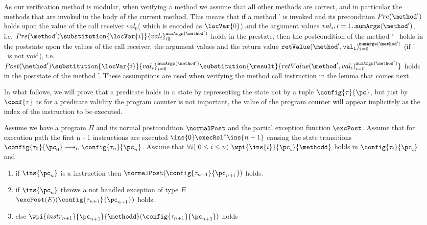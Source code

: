As our verification method is modular, when verifying a method we assume that all other methods are correct, and in particular the methods that are invoked in the body of the current method. This means that if a method \method' is invoked and its precondition  $Pre( \method')$ holds upon the value of the call receiver $val_0$( which is encoded as $\locVar{0}$) and the argument values $val_i , i = 1.. \tt{numArgs}(\method')$, i.e.  
$Pre( \method') \substitution{\locVar{i}}{val_i}_{i0}^{ \tt{numArgs}( \method')}$ holds in the prestate,
 then the postcondition of the method \method' \ holds in the poststate upon the values of the call receiver, the argument values and the return value 
$\tt{retValue}(\method', val_i)_{i=0}^{\tt{numArgs}( \method')} $
(if \method' \ is not void), i.e. 
$Post( \method') \substitution{\locVar{i}}{val_i}_{i=0}^{\tt{numArgs}( \method')} \substitution{\result}{retValue(\method', val_i)_{i=0}^{\tt{numArgs}( \method')} }$
holds in the poststate of the method \method'. These assumptions are used when verifying the method call instruction in the lemma that comes next.


In what follows, we will prove that a predicate holds in a state by representing the state not by a tuple $\config{\tau}{\pc}$, but just by $\conf{\tau}$ as for a predicate 
validity the program counter is not important, the value of the  program counter will appear implicitely as the index of the instruction to be executed. 

\begin{lemma1} \label{lemma1}
Assume we have a program $\Pi$ and its normal postcondition  $\normalPost$ and the partial exception function $\excPost$. 
Assume that for execution path the first n - 1 instructions are executed $\ins{0} \execRel^*  \ins{n-1} $ 
causing the state transitions 
$\config{\state{0}}{\pc_0}  \longrightarrow_{n} \config{\state{n}}{\pc_{n}}  $.
Assume that  $ \forall i (\ 0 \leq i \leq n ) \ \wpi{\ins{i}}{ \pc_i }{\methodd}$  holds in 
$\config{\state{i}}{\pc_{i} } $ and
\begin{enumerate}
	\item if $\ins{{\pc_n}}$ is a  instruction then $\normalPost (\config{\state{n+1}}{\pc_{n+1}})$ holds.  
	
	\item if $\ins{{\pc_n}}$ throws a not handled exception of type $E$ \\
	$\excPost(E) (\config{\state{n+1}}{\pc_{n+1}} )$ holds. 
 
	\item else $\wpi{instr_{n+1}}{\pc_{n+1} }{\methodd}  (\config{\state{n+1}}{\pc_{n+1}} ) $ holds
\end{enumerate}
\end{lemma1}


